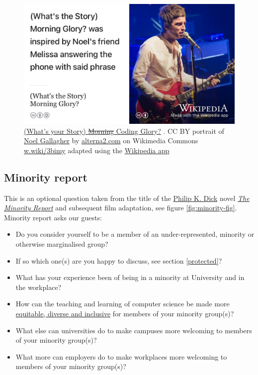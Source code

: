 \documentclass[
]{book}
\providecommand{\tightlist}{%
  \setlength{\itemsep}{0pt}\setlength{\parskip}{0pt}}
\begin{document}
\begin{figure}

{\centering \includegraphics[width=1\linewidth]{images/whats-the-story} 

}

\caption{\href{https://en.wikipedia.org/wiki/(What\%27s_the_Story)_Morning_Glory\%3F}{(What's your Story) \sout{Morning} Coding Glory?} \citep{whatsthestory}. CC BY portrait of \href{https://en.wikipedia.org/wiki/Noel_Gallagher}{Noel Gallagher} by \href{https://alterna2.com/}{alterna2.com} on Wikimedia Commons \href{https://w.wiki/3bim}{w.wiki/3bimy} adapted using the \href{https://apps.apple.com/us/app/wikipedia/id324715238}{Wikipedia app}}\label{fig:gallagher2-fig}
\end{figure}



\hypertarget{minority}{%
\subsection{Minority report}\label{minority}}

This is an optional question taken from the title of the \href{https://en.wikipedia.org/wiki/Philip_K._Dick}{Philip K. Dick} novel \emph{\href{https://en.wikipedia.org/wiki/The_Minority_Report}{The Minority Report}} and subsequent film adaptation, see figure \ref{fig:minority-fig}. Minority report asks our guests:

\begin{itemize}
\tightlist
\item
  Do you consider yourself to be a member of an under-represented, minority or otherwise marginalised group?
\item
  If so which one(s) are you happy to discuss, see section \ref{protected}?
\item
  What has your experience been of being in a minority at University and in the workplace?
\item
  How can the teaching and learning of computer science be made more \href{https://en.wikipedia.org/wiki/Diversity,_equity,_and_inclusion}{equitable, diverse and inclusive} for members of your minority group(s)?
\item
  What else can universities do to make campuses more welcoming to members of your minority group(s)?
\item
  What more can employers do to make workplaces more welcoming to members of your minority group(s)?
\end{itemize}
\end{document}
